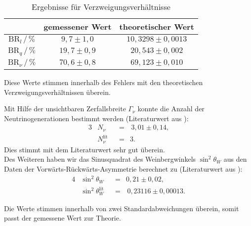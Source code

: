 \begin{table}[bh]
	\centering
	\begin{tabular}{c|cc}
		&gemessener Wert&theoretischer Wert\\\hline
		$\mathrm{BR}_l\,/\,\si{\%}$&$9,7\pm1,0$&$10,3298\pm0,0013$\\
		$\mathrm{BR}_q\,/\,\si{\%}$&$19,7\pm0,9$&$20,543\pm0,002$\\
		$\mathrm{BR}_\nu\,/\,\si{\%}$&$70,6\pm0,8$&$69,123\pm0,010$
	\end{tabular}
	\caption{Ergebnisse für Verzweigungsverhältnisse}
	\label{tab:branch}
\end{table}

Diese Werte stimmen innerhalb des Fehlers mit den theoretischen Verzweigungsverhältnissen überein.

Mit Hilfe der unsichtbaren Zerfallsbreite $\Gamma_\nu$ konnte die Anzahl der Neutrinogenerationen bestimmt werden (Literaturwert aus \cite{anleitungalt}):
\begin{alignat}{3}
	&N_\nu&&=&\,3,01\pm0,14\text{,}\\
	&N_\nu^\text{lit}&&=&3\text{.}
\end{alignat} 
Dies stimmt mit dem Literaturwert sehr gut überein.\\

Des Weiteren haben wir das Sinusquadrat des Weinbergwinkels $\sin^2\theta_W$ aus den Daten der Vorwärts-Rückwärts-Asymmetrie berechnet zu (Literaturwert aus \cite{nakamura}):
\begin{alignat}{4}
	&\sin^2\theta_W&&=&0,21\pm0,02\text{,}\\
	&\sin^2\theta_W^\text{lit}&&=&\,0,23116\pm0,00013\text{.}
\end{alignat}

Die Werte stimmen innerhalb von zwei Standardabweichungen überein, somit passt der gemessene Wert zur Theorie.
